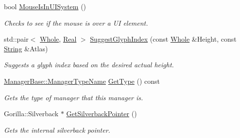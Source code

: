 \begin{DoxyCompactItemize}
bool \hyperlink{classphys_1_1UIManager_a38bc8d2ed1930a8ff6e82ef5f991dbe1}{MouseIsInUISystem} ()
\begin{DoxyCompactList}\small\item\em Checks to see if the mouse is over a UI element. \item\end{DoxyCompactList}\item 
std::pair$<$ \hyperlink{namespacephys_a460f6bc24c8dd347b05e0366ae34f34a}{Whole}, \hyperlink{namespacephys_af7eb897198d265b8e868f45240230d5f}{Real} $>$ \hyperlink{classphys_1_1UIManager_a9fff50f9a977e603e7c62a950b796a74}{SuggestGlyphIndex} (const \hyperlink{namespacephys_a460f6bc24c8dd347b05e0366ae34f34a}{Whole} \&Height, const \hyperlink{namespacephys_aa03900411993de7fbfec4789bc1d392e}{String} \&Atlas)
\begin{DoxyCompactList}\small\item\em Suggests a glyph index based on the desired actual height. \item\end{DoxyCompactList}\item 
\hyperlink{classphys_1_1ManagerBase_aaa6ccddf23892eaccb898529414f80a5}{ManagerBase::ManagerTypeName} \hyperlink{classphys_1_1UIManager_ab8fe74564ca5dc09cbe4b1cc2c007e79}{GetType} () const 
\begin{DoxyCompactList}\small\item\em Gets the type of manager that this manager is. \item\end{DoxyCompactList}\item 
Gorilla::Silverback $\ast$ \hyperlink{classphys_1_1UIManager_a21623edd39c3e23de29f4cf3ed6e490a}{GetSilverbackPointer} ()
\begin{DoxyCompactList}\small\item\em Gets the internal silverback pointer. \item\end{DoxyCompactList}\end{DoxyCompactItemize}
